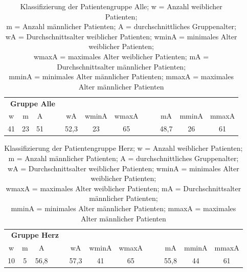 \begin{table}[H] 
\centering
\begin{tabularx}{0.855\textwidth}{ccccccccccc}
\toprule
\multicolumn{4}{c}{\textbf{Gruppe Alle}} & & & & & & &\\  
\cmidrule{1-4}
w  & m  & A  &    & wA   & wminA & wmaxA &    & mA   & mminA & mmaxA\\
\midrule
41 & 23 & 51 & ~~ & 52,3 & 23    & 65    & ~~ & 48,7 & 26    & 61\\
\bottomrule
\end{tabularx}
\caption[Gruppe Alle]{Klassifizierung der Patientengruppe Alle; w = Anzahl weiblicher Patienten;\\m = Anzahl männlicher Patienten; A = durchschnittliches Gruppenalter;\\wA = Durchschnittsalter weiblicher Patienten; wminA = minimales Alter weiblicher Patienten;\\wmaxA = maximales Alter weiblicher Patienten; mA = Durchschnittsalter männlicher Patienten;\\mminA = minimales Alter männlicher Patienten; mmaxA = maximales Alter männlicher Patienten}
\label{tab:Alle}
\end{table}


\begin{table}[H] 
\centering
\begin{tabularx}{0.87\textwidth}{ccccccccccc}
\toprule
\multicolumn{4}{c}{\textbf{Gruppe Herz}} & & & & & & &\\  
\cmidrule{1-4}
w  & m & A    &    & wA   & wminA & wmaxA &    & mA   & mminA & mmaxA\\
\midrule
10 & 5 & 56,8 & ~~ & 57,3 & 41    & 65    & ~~ & 55,8 & 44    & 61\\
\bottomrule
\end{tabularx}
\caption[Gruppe Herz]{Klassifizierung der Patientengruppe Herz; w = Anzahl weiblicher Patienten;\\m = Anzahl männlicher Patienten; A = durchschnittliches Gruppenalter;\\wA = Durchschnittsalter weiblicher Patienten; wminA = minimales Alter weiblicher Patienten;\\wmaxA = maximales Alter weiblicher Patienten; mA = Durchschnittsalter männlicher Patienten;\\mminA = minimales Alter männlicher Patienten; mmaxA = maximales Alter männlicher Patienten}
\label{tab:Herz}
\end{table}


